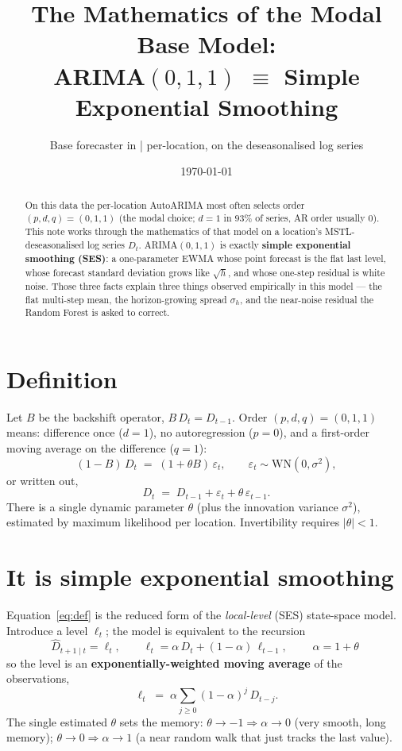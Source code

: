 \documentclass[11pt]{article}
\title{\vspace{-1.5em}The Mathematics of the Modal Base Model:\\[0.2em]
\large ARIMA$(0,1,1)$ $\equiv$ Simple Exponential Smoothing}
\author{Base forecaster in \code{mstl\_multistep} \;|\; per-location, on the deseasonalised log series}
\date{\today}
\begin{document}
\maketitle
\vspace{-1.5em}

\begin{abstract}
\noindent
On this data the per-location AutoARIMA most often selects order $(p,d,q)=(0,1,1)$ (the modal
choice; $d{=}1$ in $93\%$ of series, AR order usually $0$). This note works through the
mathematics of that model on a location's MSTL-deseasonalised log series $D_t$. ARIMA$(0,1,1)$
is exactly \textbf{simple exponential smoothing (SES)}: a one-parameter EWMA whose point
forecast is the flat last level, whose forecast standard deviation grows like $\sqrt{h}$, and
whose one-step residual is white noise. Those three facts explain three things observed
empirically in this model --- the flat multi-step mean, the horizon-growing spread
$\sigma_h$, and the near-noise residual the Random Forest is asked to correct.
\end{abstract}

\section{Definition}
Let $B$ be the backshift operator, $B\,D_t = D_{t-1}$. Order $(p,d,q)=(0,1,1)$ means: difference
once ($d=1$), no autoregression ($p=0$), and a first-order moving average on the difference
($q=1$):
\begin{equation}
(1-B)\,D_t \;=\; (1+\theta B)\,\varepsilon_t,
\qquad \varepsilon_t \sim \mathrm{WN}(0,\sigma^2),
\label{eq:def}
\end{equation}
or written out,
\begin{equation}
D_t \;=\; D_{t-1} + \varepsilon_t + \theta\,\varepsilon_{t-1}.
\label{eq:explicit}
\end{equation}
There is a single dynamic parameter $\theta$ (plus the innovation variance $\sigma^2$),
estimated by maximum likelihood per location. Invertibility requires $|\theta|<1$.

\section{It is simple exponential smoothing}
Equation~\eqref{eq:def} is the reduced form of the \emph{local-level} (SES) state-space model.
Introduce a level $\ell_t$; the model is equivalent to the recursion
\begin{equation}
\hat D_{t+1\mid t} = \ell_t,
\qquad
\ell_t = \alpha\,D_t + (1-\alpha)\,\ell_{t-1},
\qquad \boxed{\;\alpha = 1+\theta\;}
\label{eq:ses}
\end{equation}
so the level is an \textbf{exponentially-weighted moving average} of the observations,
\begin{equation}
\ell_t \;=\; \alpha\sum_{j\ge 0}(1-\alpha)^j\,D_{t-j}.
\label{eq:ewma}
\end{equation}
The single estimated $\theta$ sets the memory: $\theta\to-1\Rightarrow\alpha\to0$ (very smooth,
long memory); $\theta\to0\Rightarrow\alpha\to1$ (a near random walk that just tracks the last
value).
\end{document}

